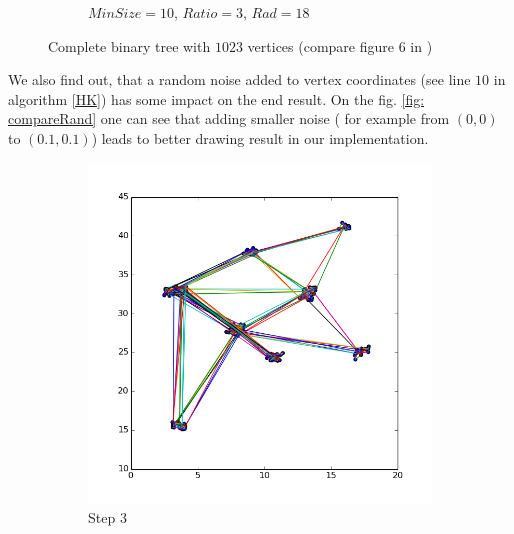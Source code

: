 \documentclass[12pt,a4paper]{article}
\begin{document}
\begin{figure}[htb]
\begin{subfigure}{0.5\textwidth}
            \caption{$MinSize=10$, $Ratio=3$, $Rad =18$}
     \end{subfigure}
     \caption{Complete binary tree with $1023$ vertices (compare figure $6$ in \cite{DavidHarel2002})}
     \label{fig: btrees}
\end{figure}     

\FloatBarrier 

We also find out, that a random noise added to vertex coordinates (see line $10$ in algorithm \ref{HK}) has some impact on the end result. On the fig. \ref{fig: compareRand} one can see that adding smaller noise ( for example from $(0,0)$ to $(0.1, 0.1)$) leads to better drawing result in our implementation.


\begin{figure}
\begin{minipage}[0.2\textheight]{\textwidth}	%
	 \begin{subfigure}{0.5\textwidth}
		   \centering
           \includegraphics[scale=0.4]{results_Harel/rand1/HK_step3_eps1.png}
           \caption{Step $3$}
     \end{subfigure}
	 \begin{subfigure}{0.5\textwidth}
			\centering

\end{subfigure}
\end{minipage}
\end{figure}
\end{document}
